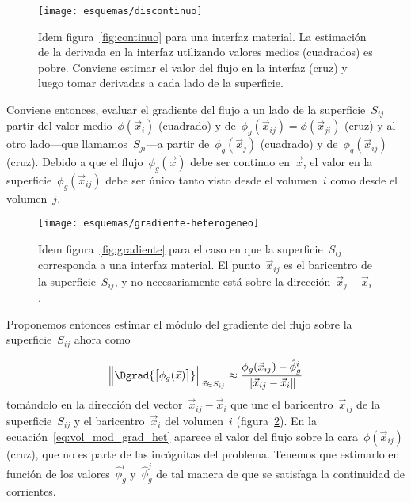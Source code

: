 \begin{figure}[h]
 \begin{center}
  \texttt{[image: esquemas/discontinuo]}
 \end{center}
\caption{\label{fig:discontinuo}Idem figura~\ref{fig:continuo} para una interfaz material. La estimación de la derivada en la interfaz utilizando valores medios (cuadrados) es pobre. Conviene estimar el valor del flujo en la interfaz (cruz) y luego tomar derivadas a cada lado de la superficie.}
\end{figure}

Conviene entonces, evaluar el gradiente del flujo a un lado de la superficie~$S_{ij}$ partir del valor medio~$\phi(\vec{x}_i)$ (cuadrado) y de~$\phi_g(\vec{x}_{ij})=\phi(\vec{x}_{ji})$ (cruz) y al otro lado---que llamamos~$S_{ji}$---a partir de~$\phi_g(\vec{x}_j)$ (cuadrado) y de~$\phi_g(\vec{x}_{ij})$ (cruz). Debido a que el flujo~$\phi_g(\vec{x})$ debe ser continuo en~$\vec{x}$, el valor en la superficie~$\phi_g(\vec{x}_{ij})$ debe ser único tanto visto desde el volumen~$i$ como desde el volumen~$j$.


\begin{figure}[bt]
 \begin{center}
  \texttt{[image: esquemas/gradiente-heterogeneo]}
 \end{center}
\caption{\label{fig:gradiente-heterogeneo}Idem figura~\ref{fig:gradiente} para el caso en que la superficie~$S_{ij}$ corresponda a una interfaz material. El punto~$\vec{x}_{ij}$ es el baricentro de la superficie~$S_{ij}$, y no necesariamente está sobre la dirección~$\vec{x}_j - \vec{x}_i$.}
\end{figure}

Proponemos entonces estimar el módulo del gradiente del flujo sobre la superficie~$S_{ij}$ ahora como

\begin{equation}\label{eq:vol_mod_grad_het}
\Big\| \Dgrad {\big[ \phi_g(\vec{x}) \big]} \Big\|_{\vec{x} \in S_{ij}} \approx \frac{\phi_g(\vec{x}_{ij}) - \hat{\phi}_g^i}{ \| \vec{x}_{ij} - \vec{x}_i \|}
\end{equation}
%
tomándolo en la dirección del vector~$\vec{x}_{ij}-\vec{x}_i$ que une el baricentro~$\vec{x}_{ij}$ de la superficie~$S_{ij}$ y el baricentro~$\vec{x}_i$ del volumen~$i$ (figura~\ref{fig:gradiente-heterogeneo}). En la ecuación~\eqref{eq:vol_mod_grad_het} aparece el valor del flujo sobre la cara~$\phi(\vec{x}_{ij})$ (cruz), que no es parte de las incógnitas del problema. Tenemos que estimarlo en función de los valores~$\hat{\phi}_g^i$ y~$\hat{\phi}_g^j$ de tal manera de que se satisfaga la continuidad de corrientes.


